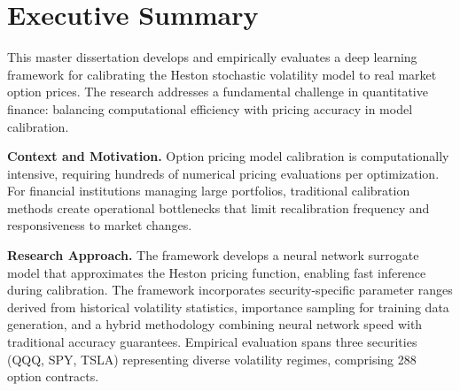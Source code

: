\documentclass[12pt,a4paper]{article}
\begin{document}



\newpage

\tableofcontents




\newpage

\listoffigures





\listoftables





\newpage

\section*{Executive Summary}


This master dissertation develops and empirically evaluates a deep learning framework for calibrating the Heston stochastic volatility model to real market option prices. The research addresses a fundamental challenge in quantitative finance: balancing computational efficiency with pricing accuracy in model calibration.

\textbf{Context and Motivation.} Option pricing model calibration is computationally intensive, requiring hundreds of numerical pricing evaluations per optimization. For financial institutions managing large portfolios, traditional calibration methods create operational bottlenecks that limit recalibration frequency and responsiveness to market changes.

\textbf{Research Approach.} The framework develops a neural network surrogate model that approximates the Heston pricing function, enabling fast inference during calibration. The framework incorporates security-specific parameter ranges derived from historical volatility statistics, importance sampling for training data generation, and a hybrid methodology combining neural network speed with traditional accuracy guarantees. Empirical evaluation spans three securities (QQQ, SPY, TSLA) representing diverse volatility regimes, comprising 288 option contracts.\\[0.5cm]
\end{document}

